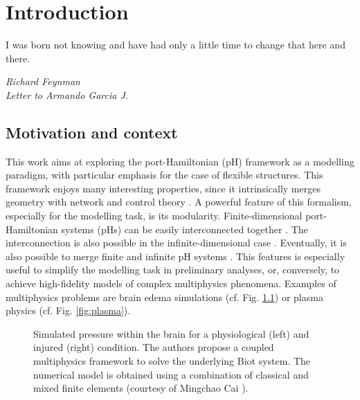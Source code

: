 \addtocounter{chapter}{0}
\chapter[Introduction]{Introduction}

\epigraph{I was born not knowing and have had only a little time to change that here and there.}
{\textit{Richard Feynman \\ Letter to Armando Garcia J.}}


\minitoc

\section{Motivation and context}

This work aims at exploring the port-Hamiltonian (pH) framework as a modelling paradigm, with particular emphasis for the case of flexible structures. This framework enjoys many interesting properties, since it intrinsically merges geometry with network and control theory \cite{vanderschaft2006book}. A powerful feature of this formalism, especially for the modelling task, is its modularity. Finite-dimensional port-Hamiltonian systems (pHs) can be easily interconnected together \cite{cervera2007interconnection}. The interconnection is also possible in the infinite-dimensional case \cite{kurula2010,augner2020int}. Eventually, it is also possible to merge finite and infinite pH systems \cite{pasumarthy2006}. This features is especially useful to simplify the modelling task in preliminary analyses, or, conversely, to achieve high-fidelity models of complex multiphysics phenomena. Examples of multiphysics problems are brain edema simulations \cite{ju2020brain} (cf. Fig. \ref{fig:p_brain}) or plasma physics \cite{nattila2019runko} (cf. Fig. \ref{fig:plasma}). \\



\begin{figure}[htbp]%
	\centering
	\hspace{8pt}%
	\caption[]{Simulated pressure within the brain for a physiological (left) and injured (right) condition. The authors propose a coupled multiphysics framework to solve the underlying Biot system. The numerical model is obtained using a combination of classical and mixed finite elements (courtesy of Mingchao Cai \cite{ju2020brain}).}%
	\label{fig:p_brain}%
\end{figure}

